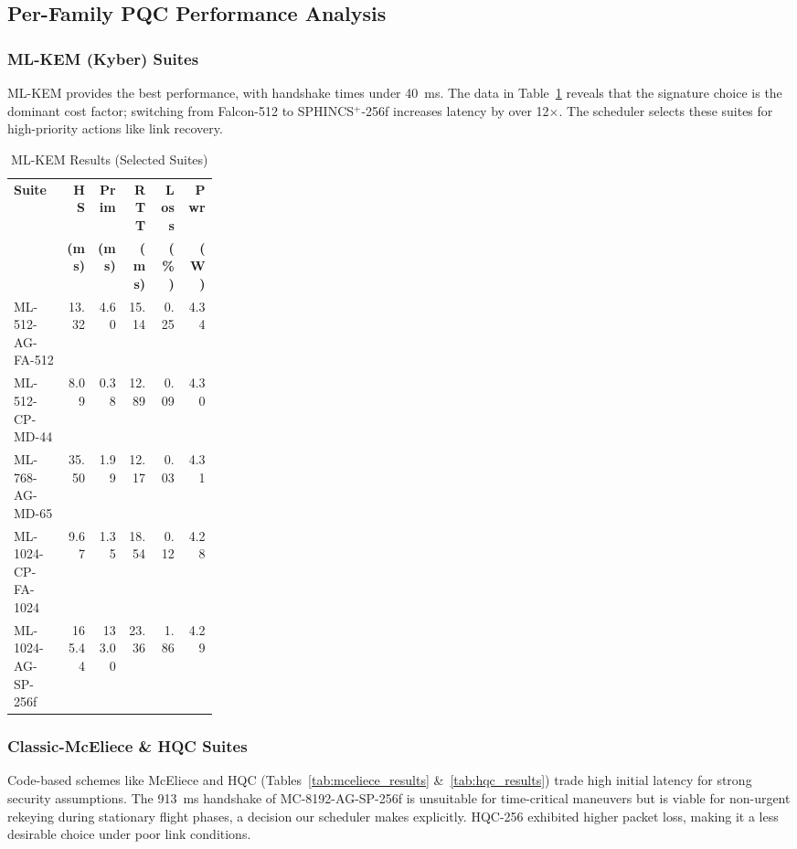 \documentclass[sigconf,natbib=false]{acmart}
\begin{document}
\subsection{Per-Family PQC Performance Analysis}

\subsubsection{ML-KEM (Kyber) Suites}
ML-KEM provides the best performance, with handshake times under 40~ms. The data in Table~\ref{tab:mlkem_results} reveals that the signature choice is the dominant cost factor; switching from Falcon-512 to SPHINCS$^+$-256f increases latency by over 12$\times$. The scheduler selects these suites for high-priority actions like link recovery.

\begin{table}[ht]
\centering
\caption{ML-KEM Results (Selected Suites)}
\label{tab:mlkem_results}
\begingroup
\footnotesize
\setlength{\tabcolsep}{2pt}
\begin{tabular}{@{}p{0.26\linewidth}rrrrr@{}}
\toprule
\textbf{Suite} & \textbf{HS} & \textbf{Prim} & \textbf{RTT} & \textbf{Loss} & \textbf{Pwr} \\
 & \textbf{(ms)} & \textbf{(ms)} & \textbf{(ms)} & \textbf{(\%)} & \textbf{(W)} \\
\midrule
ML-512-AG-FA-512 & 13.32 & 4.60 & 15.14 & 0.25 & 4.34 \\
ML-512-CP-MD-44 & 8.09 & 0.38 & 12.89 & 0.09 & 4.30 \\
ML-768-AG-MD-65 & 35.50 & 1.99 & 12.17 & 0.03 & 4.31 \\
ML-1024-CP-FA-1024 & 9.67 & 1.35 & 18.54 & 0.12 & 4.28 \\
ML-1024-AG-SP-256f & 165.44 & 133.00 & 23.36 & 1.86 & 4.29 \\
\bottomrule
\end{tabular}
\endgroup
\end{table}

\subsubsection{Classic-McEliece \& HQC Suites}
Code-based schemes like McEliece and HQC (Tables~\ref{tab:mceliece_results} \&~\ref{tab:hqc_results}) trade high initial latency for strong security assumptions. The 913~ms handshake of MC-8192-AG-SP-256f is unsuitable for time-critical maneuvers but is viable for non-urgent rekeying during stationary flight phases, a decision our scheduler makes explicitly. HQC-256 exhibited higher packet loss, making it a less desirable choice under poor link conditions.
\end{document}
